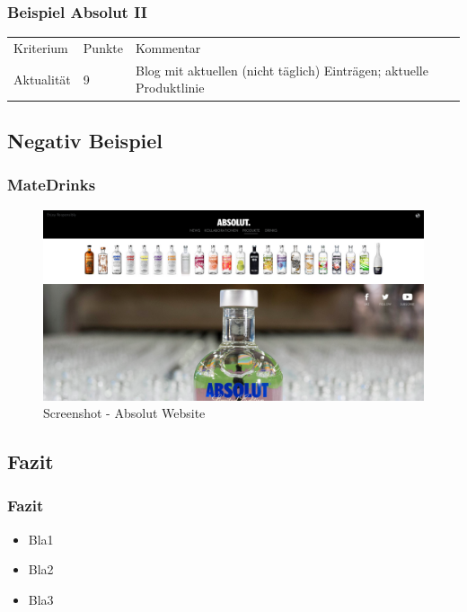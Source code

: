 \begin{frame}\frametitle{Beispiel Absolut II}
	\begin{tabular}{lll}
	  Kriterium & Punkte & Kommentar \\
  	  Aktualität & 9 & Blog mit aktuellen (nicht täglich) Einträgen; aktuelle Produktlinie \\
 	\end{tabular}
\end{frame}

\subsection{Negativ Beispiel}
\begin{frame}
	\frametitle{MateDrinks}
	\begin{figure}
	\includegraphics[scale=0.2]{bilder/absolut.png}
	\caption[Screenshot - Absolut Vodka]{Screenshot - Absolut Website}
	\label{labelname}
	\end{figure}
\end{frame}

\subsection{Fazit}
\begin{frame}
	\frametitle{Fazit}
	\begin{itemize}
		\item Bla1
		\item Bla2
		\item Bla3
	\end{itemize}
\end{frame}

